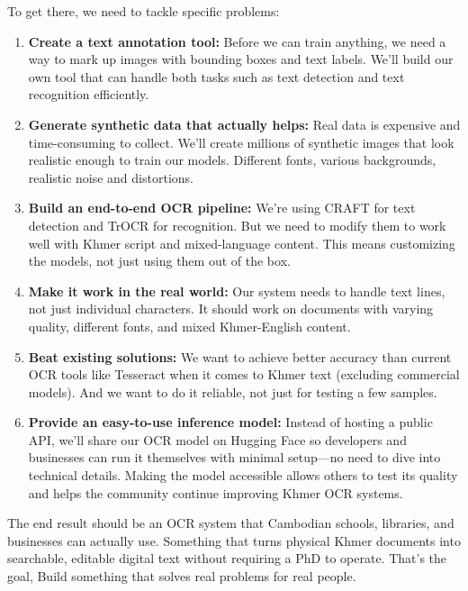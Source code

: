 To get there, we need to tackle specific problems:

\begin{enumerate}
    \item \textbf{Create a text annotation tool:    } Before we can train anything, we need a way to mark up images with bounding boxes and text labels. We'll build our own tool that can handle both tasks such as text detection and text recognition efficiently.

    \item \textbf{Generate synthetic data that actually helps:} Real data is expensive and time-consuming to collect. We'll create millions of synthetic images that look realistic enough to train our models. Different fonts, various backgrounds, realistic noise and distortions.

    \item \textbf{Build an end-to-end OCR pipeline:} We're using CRAFT for text detection and TrOCR for recognition. But we need to modify them to work well with Khmer script and mixed-language content. This means customizing the models, not just using them out of the box.

    \item \textbf{Make it work in the real world:} Our system needs to handle text lines, not just individual characters. It should work on documents with varying quality, different fonts, and mixed Khmer-English content.

    \item \textbf{Beat existing solutions:} We want to achieve better accuracy than current OCR tools like Tesseract when it comes to Khmer text (excluding commercial models). And we want to do it reliable, not just for testing a few samples.
    
    \item \textbf{Provide an easy-to-use inference model:} Instead of hosting a public API, we’ll share our OCR model on Hugging Face so developers and businesses can run it themselves with minimal setup—no need to dive into technical details. Making the model accessible allows others to test its quality and helps the community continue improving Khmer OCR systems.
\end{enumerate}

The end result should be an OCR system that Cambodian schools, libraries, 
and businesses can actually use. Something that turns physical Khmer documents 
into searchable, editable digital text without requiring a PhD to operate.
That's the goal, Build something that solves real problems for real people.


